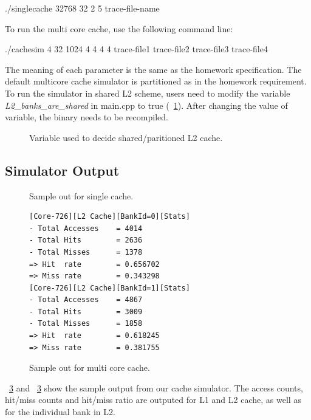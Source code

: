 \documentclass[12pt]{report}
\newcommand{\Fig}[1]{\figurename~\ref{#1}}
\begin{document}
./singlecache 32768 32 2 5 trace-file-name

To run the multi core cache, use the following command line:

./cachesim 4 32 1024 4 4 4 4 trace-file1 trace-file2 trace-file3 trace-file4

The meaning of each parameter is the same as the homework specification. The default multicore cache simulator is partitioned as in the homework requirement. To run the simulator in shared L2 scheme, users need to modify the variable \emph{L2\_banks\_are\_shared} in main.cpp to true (\Fig{fig:config_variable}). After changing the value of variable, the binary needs  to be recompiled. 

\begin{figure}[!h]
%

\caption{Variable used to decide shared/paritioned L2 cache.}
\label{fig:config_variable}
\end{figure}



\subsection{Simulator Output}

\begin{figure}[h]

\caption{Sample out for single cache.}
\label{fig:singlecache.output}
\end{figure}

\begin{figure}[!h]
%
\begin{lstlisting}
[Core-726][L2 Cache][BankId=0][Stats]
- Total Accesses	= 4014
- Total Hits		= 2636
- Total Misses		= 1378
=> Hit  rate		= 0.656702
=> Miss rate		= 0.343298
[Core-726][L2 Cache][BankId=1][Stats]
- Total Accesses	= 4867
- Total Hits		= 3009
- Total Misses		= 1858
=> Hit  rate		= 0.618245
=> Miss rate		= 0.381755
\end{lstlisting}
\caption{Sample out for multi core cache.}
\label{fig:singlecache.output}
\end{figure}

\Fig{fig:singlecache.output} and \Fig{fig:singlecache.output} show the sample output from our cache simulator. The access counts, hit/miss counts and hit/miss ratio are outputed for L1 and L2 cache, as well as for the individual bank in L2. 
\end{document}

